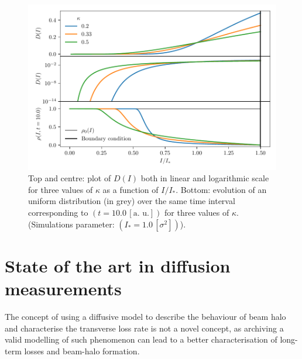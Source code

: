 \begin{figure}[htp]
    \centering
    \includegraphics[width=\textwidth]{4_probing_the_diffusive_behavior/figs/diffusion_coefficient.pdf}
    \caption{Top and centre: plot of $D(I)$ both in linear and logarithmic scale for three values of $\kappa$ as a function of $I/I_\ast$.
    Bottom: evolution of an uniform distribution (in grey) over the same time interval corresponding to $(t=10.0 \, [\text{a. u.}])$ for three values of $\kappa$. (Simulations parameter: $(I_\ast = 1.0\,[\sigma^2])$).}
    \label{fig:1}
\end{figure}

\section{State of the art in diffusion measurements}

The concept of using a diffusive model to describe the behaviour of beam halo and characterise the transverse loss rate is not a novel concept, as archiving a valid modelling of such phenomenon can lead to a better characterisation of long-term losses and beam-halo formation.

